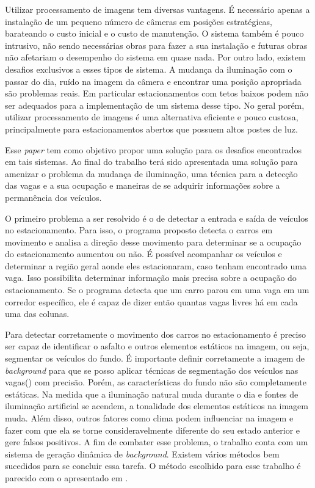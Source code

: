 Utilizar processamento de imagens tem diversas vantagens. É necessário apenas a instalação de um pequeno número de câmeras em posições estratégicas, barateando o custo inicial e o custo de manutenção. O sistema também é pouco intrusivo, não sendo necessárias obras para fazer a sua instalação e futuras obras não afetariam o desempenho do sistema em quase nada. Por outro lado, existem desafios exclusivos a esses tipos de sistema. A mudança da iluminação com o passar do dia, ruído na imagem da câmera e encontrar uma posição apropriada são problemas reais. Em particular estacionamentos com tetos baixos podem não ser adequados para a implementação de um sistema desse tipo. No geral porém, utilizar processamento de imagens é uma alternativa eficiente e pouco custosa, principalmente para estacionamentos abertos que possuem altos postes de luz.

Esse \textit{paper} tem como objetivo propor uma solução para os desafios encontrados em tais sistemas. Ao final do trabalho terá sido apresentada uma solução para amenizar o problema da mudança de iluminação, uma técnica para a detecção das vagas e a sua ocupação e maneiras de se adquirir informações sobre a permanência dos veículos.

O primeiro problema a ser resolvido é o de detectar a entrada e saída de veículos no estacionamento. Para isso, o programa proposto detecta o carros em movimento e analisa a direção desse movimento para determinar se a ocupação do estacionamento aumentou ou não. É possível acompanhar os veículos e determinar a região geral aonde eles estacionaram, caso tenham encontrado uma vaga. Isso possibilita determinar informação mais precisa sobre a ocupação do estacionamento. Se o programa detecta que um carro parou em uma vaga em um corredor específico, ele é capaz de dizer então quantas vagas livres há em cada uma das colunas.

Para detectar corretamente o movimento dos carros no estacionamento é preciso ser capaz de identificar o asfalto e outros elementos estáticos na imagem, ou seja, segmentar os veículos do fundo. É importante definir corretamente a imagem de \textit{background} para que se posso aplicar técnicas de segmentação dos veículos nas vagas(\cite{delibaltov2013parking}\cite{true2007vacant}) com precisão. Porém, as características do fundo não são completamente estáticas. Na medida que a iluminação natural muda durante o dia e fontes de iluminação artificial se acendem, a tonalidade dos elementos estáticos na imagem muda. Além disso, outros fatores como clima podem influenciar na imagem e fazer com que ela se torne consideravelmente diferente do seu estado anterior e gere falsos positivos. A fim de combater esse problema, o trabalho conta com um sistema de geração dinâmica de \textit{background}. Existem vários métodos bem sucedidos para se concluir essa tarefa\cite{chen2012dynamic}\cite{hai2009self}\cite{shoushtarian2003practical}. O método escolhido para esse trabalho é parecido com o apresentado em \cite{hai2009self}.

